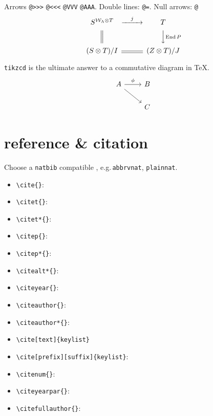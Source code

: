 \documentclass[12pt]{amsart}
\theoremstyle{plain}
\theoremstyle{definition}
\theoremstyle{remark}
\numberwithin{equation}{section} %
\begin{document}
Arrows \verb|@>>>| \verb|@<<<| \verb|@VVV| \verb|@AAA|. Double lines: \verb|@=|. Null arrows: \verb|@|
\begin{equation}\label{key}
	\begin{CD}
		S^{{\mathcal{W}}_{\Lambda}\otimes T} @>j>> T\\
		@|  @VV{\operatorname{End} P}V\\
		(S\otimes T)/I  @= (Z\otimes T)/J
	\end{CD}
\end{equation}


\verb|tikzcd| is the ultimate answer to a commutative diagram in \TeX.
\[ \begin{tikzcd}
		A \arrow[rd] \arrow[r, "\phi"] & B \\
		& C
	\end{tikzcd}  \]

\section{reference \& citation}
Choose a \verb*|natbib| compatible \verb||, e.g.\,\verb|abbrvnat|, \verb|plainnat|.
\begin{itemize}[$\cdot$]
	\item \verb*|\cite{}|: \cite{AkiyamaEtAl2020}
	\item \verb*|\citet{}|: \citet{AkiyamaEtAl2020}
	\item \verb*|\citet*{}|: \citet*{AkiyamaEtAl2020}
	\item \verb*|\citep{}|: \citep{AkiyamaEtAl2020}
	\item \verb*|\citep*{}|: \citep*{AkiyamaEtAl2020}
	\item \verb*|\citealt*{}|: \citealt*{AkiyamaEtAl2020}
	\item \verb*|\citeyear{}|: \citeyear{AkiyamaEtAl2020}
	\item \verb*|\citeauthor{}|: \citeauthor{AkiyamaEtAl2020}
	\item \verb*|\citeauthor*{}|: \citeauthor*{AkiyamaEtAl2020}
	\item \verb*|\cite[text]{keylist}| \cite[Theorem 1]{AkiyamaEtAl2020}
	\item \verb*|\cite[prefix][suffix]{keylist}|: \cite[see e.g.\!][p.\,123]{AkiyamaEtAl2020}
	\item \verb*|\citenum{}|: 
	\item \verb*|\citeyearpar{}|: \citeyearpar{AkiyamaEtAl2020}
	\item \verb*|\citefullauthor{}|: 
\end{itemize}
\end{document}
